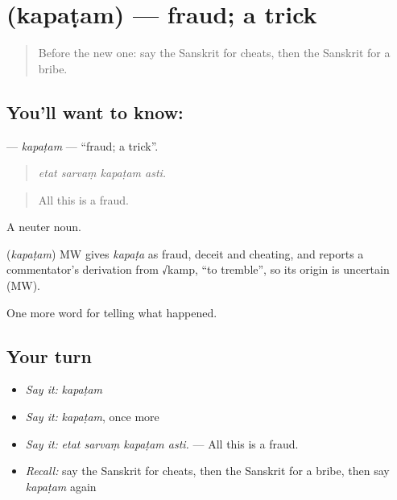 \section[\texorpdfstring{\sk{कपटम्} (kapaṭam)}{कपटम् (kapaṭam)}]{ (kapaṭam) — fraud; a trick}

\label{lesson:SA-C291-kapatam}



\begin{quote}
Before the new one: say the Sanskrit for cheats, then the Sanskrit for a bribe.
\end{quote}

\subsection*{You'll want to know: }
\textbf{} — \emph{kapaṭam} — \textquotedblleft{}fraud; a trick\textquotedblright{}.

\begin{quote}
   
\end{quote}

\begin{quote}
\emph{etat sarvaṃ kapaṭam asti.}
\end{quote}

\begin{quote}
All this is a fraud.
\end{quote}

A neuter noun.

\begin{cousinweb}
\textbf{} (\emph{kapaṭam}) MW gives \emph{kapaṭa} as fraud, deceit and cheating, and reports a commentator's derivation from √kamp, \textquotedblleft{}to tremble\textquotedblright{}, so its origin is uncertain (MW).
\end{cousinweb}

\begin{grammarlens}[title={What you've built}]
One more word for telling what happened.
\end{grammarlens}

\subsection*{Your turn}
\begin{itemize}
\raggedright
  \item \emph{Say it:} \emph{kapaṭam}
  \item \emph{Say it:} \emph{kapaṭam}, once more
  \item \emph{Say it:} \emph{etat sarvaṃ kapaṭam asti.} — All this is a fraud.
  \item \emph{Recall:} say the Sanskrit for cheats, then the Sanskrit for a bribe, then say \emph{kapaṭam} again
\end{itemize}

